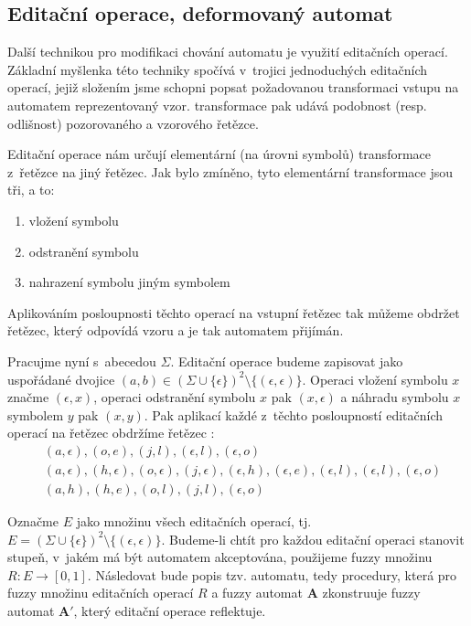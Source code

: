 \subsection{Editační operace, deformovaný automat} \label{sec:DefAut}
Další technikou pro modifikaci chování automatu je využití editačních operací. Základní myšlenka této techniky spočívá v~trojici jednoduchých editačních operací, jejiž složením jsme schopni popsat požadovanou transformaci vstupu na automatem reprezentovaný vzor.  transformace pak udává podobnost (resp. odlišnost) pozorovaného a vzorového řetězce.

Editační operace nám určují elementární (na úrovni symbolů) transformace z~řetězce na jiný řetězec. Jak bylo zmíněno, tyto elementární transformace jsou tři, a to:
\begin{enumerate}
 \item vložení symbolu
 \item odstranění symbolu
 \item nahrazení symbolu jiným symbolem
\end{enumerate}

Aplikováním posloupnosti těchto operací na vstupní řetězec tak můžeme obdržet řetězec, který odpovídá vzoru a je tak automatem přijímán.

Pracujme nyní s~abecedou $\Sigma$. Editační operace budeme zapisovat jako uspořádané dvojice $(a, b) \in (\Sigma \cup \{ \epsilon \})^2 \setminus \{ (\epsilon, \epsilon) \}$. Operaci vložení symbolu $x$ značme $(\epsilon, x)$, operaci odstranění symbolu $x$ pak $(x, \epsilon)$ a náhradu symbolu $x$ symbolem $y$ pak $(x, y)$. Pak aplikací každé z~těchto posloupností editačních operací na řetězec  obdržíme řetězec :
\begin{align*}
 & (a,\epsilon), (o,e), (j,l), (\epsilon,l), (\epsilon, o) \\
 & (a, \epsilon), (h,\epsilon), (o,\epsilon), (j,\epsilon), (\epsilon,h), (\epsilon,e), (\epsilon,l), (\epsilon,l), (\epsilon,o) \\
 & (a,h), (h,e), (o,l), (j,l), (\epsilon,o) 
\end{align*}

Označme $E$ jako množinu všech editačních operací, tj. $E = (\Sigma \cup \{ \epsilon \})^2 \setminus \{ (\epsilon, \epsilon) \}$. Budeme-li chtít pro každou editační operaci stanovit stupeň, v~jakém má být automatem akceptována, použijeme fuzzy množinu  $R: E \rightarrow [0, 1]$. Následovat bude popis tzv.  automatu, tedy procedury, která pro fuzzy množinu editačních operací $R$ a fuzzy automat $\mathbf{A}$ zkonstruuje fuzzy automat $\mathbf{A}'$, který editační operace reflektuje.

